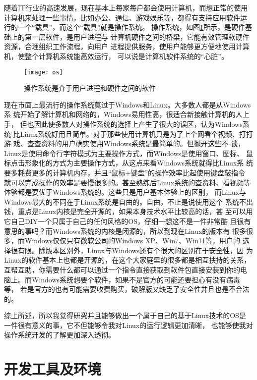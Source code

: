随着IT行业的高速发展，现在基本上每家每户都会使用计算机，而想正常的使用
计算机来处理一些事情，比如办公、通信、游戏娱乐等，都得有支持应用软件运
行的一个“载具”，而这个“载具”就是操作系统。
操作系统，如图\ref{fig:os}所示，是硬件基础上的第一层软件，是用户进程与
计算机硬件之间的桥梁，它能有效管理软硬件资源，合理组织工作流程，向用户
进程提供服务，使用户能够更方便地使用计算机，使整个计算机系统能高效运行，
可以说是计算机软件系统的“心脏”。

\begin{figure}
  \centering
  \texttt{[image: os]}
  \caption{操作系统是介于用户进程和硬件之间的软件}
  \label{fig:os}
\end{figure}

现在市面上最流行的操作系统莫过于Windows和Linux。大多数人都是从Windows系
统开始了解计算机和网络的，Windows易用性高，很适合新接触计算机的人上手，
但也因此使多数人对操作系统的选择上产生了很大的误区，认为Windows系统
比Linux系统好用且简单。对于那些使用计算机只是为了上个网看个视频、打打游
戏、查查资料的用户确实使用Windows系统是最简单的。但抛开这些不
谈，Linux是使用命令行字符模式为主要操作方式，而Windows是使用窗口、图标、
鼠标点击形象化的方式为主要操作方式，从这点来看Windows系统就得比Linux系
统要多耗费更多的计算机内存，并且“鼠标+键盘”的操作效率比起使用键盘敲指令
就可以完成操作的效率是要慢很多的。甚至熟练后Linux系统的查资料、看视频等
体验都是要优于Windows系统的。这些只是用户基本体验上的区别，
而Linux与Windows最大的不同在于Linux系统是自由的。自由，不止是说使用这个
系统不出钱，重点是Linux内核是完全开源的，如果本身技术水平比较高的话，甚
至可以用它自己DIY一个只属于自己的任何风格的OS，仔细一想这不是一件非常酷
且很有意思的事吗？而Windows系统的内核是闭源的，所以到现在Linux的版本有
很多很多，而Windows仅仅只有微软公司的Windows XP、Win7、Win11等，用户的
选择很有限。除版本区别外，Linux与Windows还有个很大的区别在于安全性，因
为Linux的软件基本上也都是开源的，在这个大家庭里的很多都是相互扶持的关系，
互帮互助，你需要什么都可以通过一个指令直接获取到软件包直接安装到你的电
脑上。而Windows系统想要个软件，如果不是官方的可能还要担心有没有病毒等，
若是官方的也有可能需要收费购买，破解版又缺乏了安全性并且也是不合法
的\cite{lt2021}。

综上所述，所以我觉得研究并且能够做出一个属于自己的基于Linux技术的OS是
一件很有意义的事，它不但能够令我对Linux的运行逻辑更加清晰，
也能够使我对操作系统开发的了解更加深入透彻。

\section{开发工具及环境}

